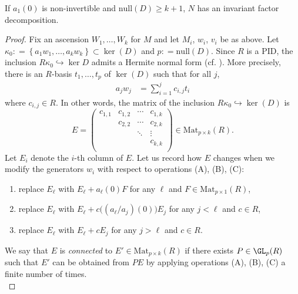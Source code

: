  
 \begin{theorem}   \label{mainabsteo1}    If $ a_{1}(0) $ is non-invertible  and  $ \mathrm{null}(D) \geq   k + 1 $,  
$ N $ has an invariant factor decomposition. 
\end{theorem}  
\begin{proof}  Fix an ascension $ W_{1}, \ldots, W_{k} $ for $ M $ and let $ M_{i} $, $ w_{i} $, $ v_{i} $ be as above. Let $ \kappa_{0} :  = \left \{ a_{1}w_{1} , \ldots, a_{k} w_{k} \right \}   \subset \ker(D)   $     
and $ p :  = \mathrm{null}(D) $.  Since $ R $ is a PID, the inclusion $ R \kappa_{0}  \hookrightarrow \ker D $ admits a Hermite normal form (cf. \cite[\S 3.2]{Zassenhaus}).  More precisely, there is an $ R $-basis $  t_{1}, \ldots, t_{p} $ of $ \ker ( D  ) $  such  that  for all $ j $,    
\begin{align}  \label{hermiteeq}  a_{j}  w_{j}     & =  \sum_{i = 1 } ^ {  j  }   c_{i,j} t_{i}    %
\end{align}
where   $     c_{i,j} \in R $. In other words, the matrix of the inclusion $ R \kappa _{0}  \hookrightarrow \ker (D) $ is
\[E =   \left (  \begin{matrix} c_{1,1} & c_{1,2} & \cdots & c_{1,k}   \\
& c_{2,2} & \cdots & c_{2,k} \\
 &  &  \ddots & \vdots  \\
 &  & & c_{k,k} \\
 & 
\end{matrix}  \right   )  \in  \mathrm{Mat}_{p \times k } (  R    ).\]
Let $ E_{i} $ denote the $ i $-th column of $ E $. Let us record how $ E $ changes when we modify the generators $ w_{i}   $ with respect to operations (A), (B), (C): 
\begin{enumerate} 
\item [(A)] replace $E_{\ell}  $ with $ E_{\ell} + a_{\ell} (0) F $  for any $ \ell $ and $ F  \in \mathrm{Mat}_{p \times 1}(R) $,    
\item[(B)]   replace $ E_{\ell} $ with $ E_{\ell} + c \big((a_{\ell}/a_{j})(0)\big) E_{j}  $  for any $ j   <  \ell $ and $ c \in  R $,    
\item [(C)] replace $ E_{\ell} $ with $ E_{\ell} + c E_{j} $ for any $  j    >  \ell  $ and $ c \in R $.        
\end{enumerate} 
We say that $ E $ is \emph{connected} to $ E ' \in \mathrm{Mat}_{p \times k}(R) $ if there exists  $ P \in \GL_{p}(R) $ such that $ E' $ can be obtained from $ PE $ by applying operations (A), (B), (C) a finite number of times. \\


\end{proof}
